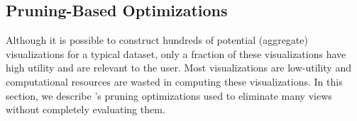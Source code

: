 

\subsection{Pruning-Based Optimizations}
\label{sec:pruning_opt}
Although it is possible to construct hundreds of potential (aggregate)
visualizations for a typical dataset, only a fraction of these visualizations 
have high utility and are relevant to the user.
Most visualizations are low-utility and computational resources
are wasted in computing these visualizations.
In this section, we describe \SeeDB's pruning optimizations used to 
eliminate many views without completely evaluating them.



